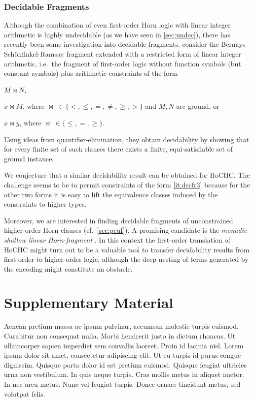 \documentclass[a4paper,twoside,notitlepage,openright,11pt]{report}
\begin{document}
\subsection{Decidable Fragments}
Although the combination of even first-order Horn logic with linear integer arithmetic is highly undecidable (as we have seen in \cref{sec:undec}), there has recently been some investigation into decidable fragments. \cite{HVW17b} consider the Bernays-Sch\"onfinkel-Ramsay fragment extended with a restricted form of linear integer arithmetic, i.e.\ the fragment of first-order logic without function symbols (but constant symbols) plus arithmetic constraints of the form
\begin{enumerate*}
\item\label{it:decfr1} $M\bowtie N$,
\item\label{it:decfr2} $x\bowtie M$, where $\bowtie\;\in\{<,\leq,=,\neq,\geq,>\}$ and $M,N$ are ground, or
\item\label{it:decfr3} $x\bowtie y$, where $\bowtie\;\in\{\leq,=,\geq\}$.
\end{enumerate*}
Using ideas from quantifier-elimination, they obtain decidability by showing that for every finite set of such clauses there exists a finite, equi-satisfiable set of ground instance.

We conjecture that a similar decidability result can be obtained for HoCHC. The challenge seems to be to permit constraints of the form \ref{it:decfr3} because for the other two forms it is easy to lift the equivalence classes induced by the constraints to higher types.

Moreover, we are interested in finding decidable fragments of unconstrained higher-order Horn clauses (cf.\ \cref{sec:peuf}). A promising candidate is the \emph{monadic shallow linear Horn-fragment} \cite{W99,TW17}. In this context the first-order translation of HoCHC might turn out to be a valuable tool to transfer decidability results from first-order to higher-order logic, although the deep nesting of terms generated by the encoding might constitute an obstacle.





\appendix
\chapter{Supplementary Material}
Aenean pretium massa ac ipsum pulvinar, accumsan molestie turpis euismod. Curabitur non consequat nulla. Morbi hendrerit justo in dictum rhoncus. Ut ullamcorper sapien imperdiet sem convallis laoreet. Proin id lacinia nisl. Lorem ipsum dolor sit amet, consectetur adipiscing elit. Ut eu turpis id purus congue dignissim. Quisque porta dolor id est pretium euismod. Quisque feugiat ultricies urna non vestibulum. In quis neque turpis. Cras mollis metus in aliquet auctor. In nec arcu metus. Nunc vel feugiat turpis. Donec ornare tincidunt metus, sed volutpat felis.
\end{document}
